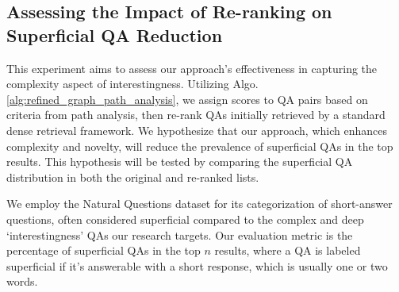 \documentclass[11pt]{article}
\begin{document}
\subsection{Assessing the Impact of Re-ranking on Superficial QA Reduction}
\label{exp:2}

This experiment aims to assess our approach's effectiveness in capturing the complexity aspect of interestingness. Utilizing Algo.\ref{alg:refined_graph_path_analysis}, we assign scores to QA pairs based on criteria from path analysis, then re-rank QAs initially retrieved by a standard dense retrieval framework. We hypothesize that our approach, which enhances complexity and novelty, will reduce the prevalence of superficial QAs in the top results. This hypothesis will be tested by comparing the superficial QA distribution in both the original and re-ranked lists.


We employ the Natural Questions dataset \cite{DBLP:journals/tacl/KwiatkowskiPRCP19} for its categorization of short-answer questions, often considered superficial compared to the complex and deep `interestingness' QAs our research targets. Our evaluation metric is the percentage of superficial QAs in the top $n$ results, where a QA is labeled superficial if it's answerable with a short response, which is usually one or two words.
\end{document}
